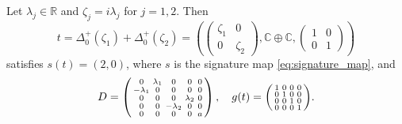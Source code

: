 \documentclass{article}
\theoremstyle{definition}
\newcommand{\R}{\mathbb{R}}
\newcommand{\C}{\mathbb{C}}
\newenvironment{smallpmatrix}{\left(\begin{smallmatrix}}{\end{smallmatrix}\right)}
\begin{document}
Let $\lambda_j\in\R$ and $\zeta_j=i\lambda_j$ for $j=1,2$. Then $$t=\Delta_0^+(\zeta_1)+\Delta_0^+(\zeta_2)=\left(\begin{pmatrix}
    \zeta_1&0\\
    0&\zeta_2
\end{pmatrix},\C\oplus\C,\begin{pmatrix}
    1&0\\
    0&1
\end{pmatrix}\right)$$ satisfies $s(t)=(2,0)$, where $s$ is the signature map \eqref{eq:signature_map}, and \begin{equation}\label{6d_noniso_(2,0)}
    D=\left(\begin{smallmatrix}
    0 & \lambda_1 & 0 & 0 & 0 \\
    -\lambda_1 & 0 & 0 & 0 & 0 \\
    0 & 0 & 0 & \lambda_2 & 0 \\
    0 & 0 & -\lambda_2 & 0 & 0 \\
    0 & 0 & 0 & 0 & a
\end{smallmatrix}\right),\quad g(t)=\begin{smallpmatrix}
    1 & 0 & 0 & 0 \\
    0 & 1 & 0 & 0 \\
    0 & 0 & 1 & 0 \\
    0 & 0 & 0 & 1
\end{smallpmatrix}.\end{equation}
\end{document}
